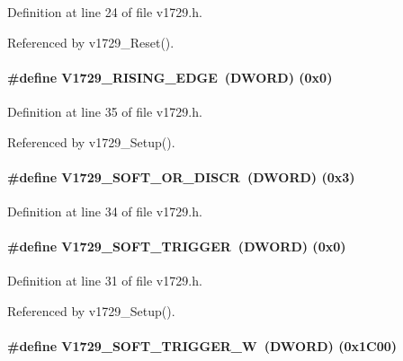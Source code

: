 Definition at line 24 of file v1729.h.

Referenced by v1729\_\-Reset().
\paragraph[{V1729\_\-RISING\_\-EDGE}]{\setlength{\rightskip}{0pt plus 5cm}\#define V1729\_\-RISING\_\-EDGE~({\bf DWORD})   (0x0)}\hfill\label{v1729_8h_a506fff504b3d921cef87d80a5784f99a}


Definition at line 35 of file v1729.h.

Referenced by v1729\_\-Setup().
\paragraph[{V1729\_\-SOFT\_\-OR\_\-DISCR}]{\setlength{\rightskip}{0pt plus 5cm}\#define V1729\_\-SOFT\_\-OR\_\-DISCR~({\bf DWORD})   (0x3)}\hfill\label{v1729_8h_a401bfa1eb92bbdcd27902c7060e3aa7e}


Definition at line 34 of file v1729.h.
\paragraph[{V1729\_\-SOFT\_\-TRIGGER}]{\setlength{\rightskip}{0pt plus 5cm}\#define V1729\_\-SOFT\_\-TRIGGER~({\bf DWORD})   (0x0)}\hfill\label{v1729_8h_a820c629e95027fba3cedf1250c386786}


Definition at line 31 of file v1729.h.

Referenced by v1729\_\-Setup().
\paragraph[{V1729\_\-SOFT\_\-TRIGGER\_\-W}]{\setlength{\rightskip}{0pt plus 5cm}\#define V1729\_\-SOFT\_\-TRIGGER\_\-W~({\bf DWORD}) (0x1C00)}\hfill\label{v1729_8h_ae3bff7a278e4eea46ce3ccf5b8944232}


